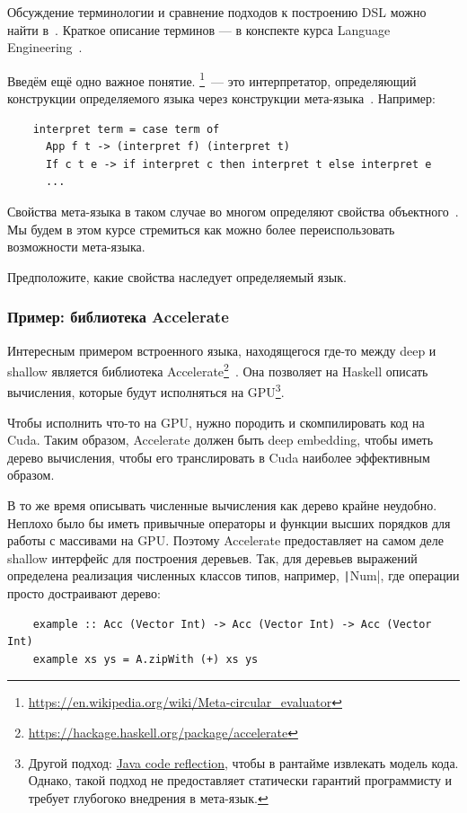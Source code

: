 Обсуждение терминологии и сравнение подходов к построению DSL можно найти в~\cite{gibbons2013functional}.
Краткое описание терминов --- в конспекте курса Language Engineering~\cite{languageEngineering}.

Введём ещё одно важное понятие.
\footnote{\url{https://en.wikipedia.org/wiki/Meta-circular_evaluator}}~--- это интерпретатор, определяющий конструкции определяемого языка через конструкции мета-языка~\cite{reynolds1972definitional}.
Например:
\begin{verbatim}
    interpret term = case term of
      App f t -> (interpret f) (interpret t)
      If c t e -> if interpret c then interpret t else interpret e
      ...
\end{verbatim}

Свойства мета-языка в таком случае во многом определяют свойства объектного~\cite{reynolds1972definitional,reynolds1998definitional}.
Мы будем в этом курсе стремиться как можно более переиспользовать возможности мета-языка.

\begin{task}
    Предположите, какие свойства наследует определяемый язык.
\end{task}

\subsubsection{Пример: библиотека Accelerate}

Интересным примером встроенного языка, находящегося где-то между deep и shallow является библиотека Accelerate\footnote{\url{https://hackage.haskell.org/package/accelerate}}~\cite[глава 6]{marlow2011parallel}.
Она позволяет на Haskell описать вычисления, которые будут исполняться на GPU\footnote{Другой подход: \href{https://youtu.be/6c0DB2kwF_Q?si=-nB7AkCsDWB_Q-hy}{Java code reflection}, чтобы в рантайме извлекать модель кода. Однако, такой подход не предоставляет статически гарантий программисту и требует глубогоко внедрения в мета-язык.}.

Чтобы исполнить что-то на GPU, нужно породить и скомпилировать код на Cuda.
Таким образом, Accelerate должен быть deep embedding, чтобы иметь дерево вычисления, чтобы его транслировать в Cuda наиболее эффективным образом.

В то же время описывать численные вычисления как дерево крайне неудобно.
Неплохо было бы иметь привычные операторы и функции высших порядков для работы с массивами на GPU\@.
Поэтому Accelerate предоставляет на самом деле shallow интерфейс для построения деревьев.
Так, для деревьев выражений определена реализация численных классов типов, например, \texttt|Num|, где операции просто достраивают дерево:
\begin{verbatim}
    example :: Acc (Vector Int) -> Acc (Vector Int) -> Acc (Vector Int)
    example xs ys = A.zipWith (+) xs ys
\end{verbatim}

